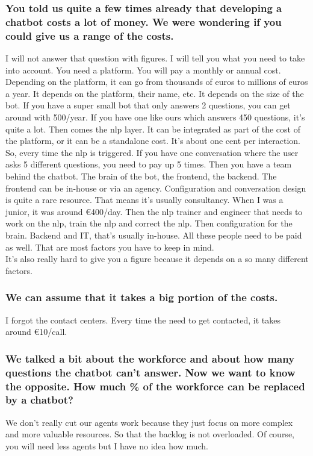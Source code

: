 \begin{appendices}
	\subsubsection{You told us quite a few times already that developing a chatbot costs a lot of money. We were wondering if you could give us a range of the costs.}
	I will not answer that question with figures. I will tell you what you need to take into account. You need a platform. You will pay a monthly or annual cost. Depending on the platform, it can go from thousands of euros to millions of euros a year. It depends on the platform, their name, etc. It depends on the size of the bot. If you have a super small bot that only answers 2 questions, you can get around with 500/year. If you have one like ours which answers 450 questions, it’s quite a lot. Then comes the \acrshort{nlp} layer. It can be integrated as part of the cost of the platform, or it can be a standalone cost. It’s about one cent per interaction. So, every time the \acrshort{nlp} is triggered. If you have one conversation where the user asks 5 different questions, you need to pay up 5 times. Then you have a team behind the chatbot. The brain of the bot, the frontend, the backend. The frontend can be in-house or via an agency. Configuration and conversation design is quite a rare resource. That means it’s usually consultancy. When I was a junior, it was around €400/day. Then the \acrshort{nlp} trainer and engineer that needs to work on the \acrshort{nlp}, train the \acrshort{nlp} and correct the \acrshort{nlp}. Then configuration for the brain. Backend and IT, that’s usually in-house. All these people need to be paid as well. That are most factors you have to keep in mind.\\
	\break
	It's also really hard to give you a figure because it depends on a so many different factors.
	
	\subsubsection{We can assume that it takes a big portion of the costs.}
	I forgot the contact centers. Every time the need to get contacted, it takes around €10/call.
	
	\subsubsection{We talked a bit about the workforce and about how many questions the chatbot can’t answer.
		Now we want to know the opposite. How much \% of the workforce can be replaced by a chatbot?}
	We don’t really cut our agents work because they just focus on more complex and more valuable resources. So that the backlog is not overloaded. Of course, you will need less agents but I have no idea how much. 
	

\end{appendices}
